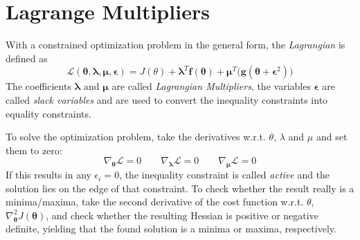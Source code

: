 \documentclass[a4paper, 11pt, accentcolor = tud3b]{tudreport}
\renewcommand{\vec}[1]{\mathbf{#1}}
\begin{document}
		\section{Lagrange Multipliers}
			With a constrained optimization problem in the general form, the \emph{Lagrangian} is defined as
			\begin{equation}
				\mathcal{L}(\vec{\theta}, \vec{\lambda}, \vec{\mu}, \vec{\epsilon}) = J(\theta) + \vec{\lambda}^T\vec{f}(\vec{\theta}) + \vec{\mu}^T \big(\vec{g}(\vec{\theta} + \vec{\epsilon}^2)\big)
			\end{equation}
			The coefficients \(\vec{\lambda}\) and \( \vec{\mu} \) are called \emph{Lagrangian Multipliers}, the variables \( \vec{\epsilon} \) are called \emph{slack variables} and are used to convert the inequality constraints into equality constraints.

			To solve the optimization problem, take the derivatives w.r.t. \( \theta \), \(\lambda\) and \(\mu\) and set them to zero:
			\begin{equation}
				\nabla_{\vec{\theta}} \mathcal{L} = 0 \qquad \nabla_{\vec{\lambda}} \mathcal{L} = 0 \qquad \nabla_{\vec{\mu}} \mathcal{L} = 0
			\end{equation}
			If this results in any \( \epsilon_i = 0 \), the inequality constraint is called \emph{active} and the solution lies on the edge of that constraint. To check whether the result really is a minima/maxima, take the second derivative of the cost function w.r.t. \(\theta\), \( \nabla_{\vec{\theta}}^2 J(\vec{\theta}) \), and check whether the resulting Hessian is positive or negative definite, yielding that the found solution is a minima or maxima, respectively.
\end{document}
